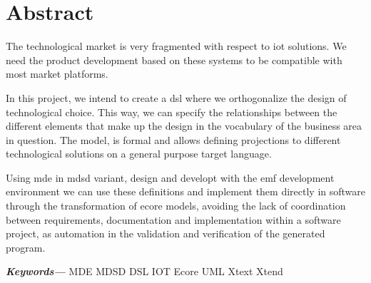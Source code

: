 \chapter*{Abstract}

The technological market is very fragmented with respect to \gls{iot} solutions. We need the product development based on these systems to be compatible with most market platforms.

In this project, we intend to create a \gls{dsl} where we orthogonalize the design of technological choice. This
way, we can specify the relationships between the different elements that make up
the design in the vocabulary of the business area in question. The
model, is formal and allows defining projections to different technological solutions on a general purpose target language.

Using \gls{mde} in \gls{mdsd} variant, design and developt with the \gls{emf} development environment we can use these definitions and implement them directly
in software through the transformation of \gls{ecore} models, avoiding the lack of coordination between requirements, documentation and implementation within a software project, as automation in the validation and verification of the generated program.


\textbf{\textit{Keywords---}} MDE MDSD DSL IOT Ecore UML Xtext Xtend

